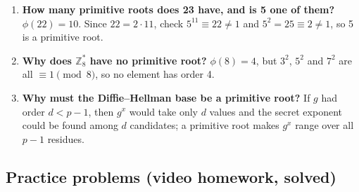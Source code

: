 \begin{enumerate}[leftmargin=1.5em]
  \item \textbf{How many primitive roots does 23 have, and is 5 one of them?} $\phi(22) = 10$. Since $22 = 2 \cdot 11$, check $5^{11} \equiv 22 \ne 1$ and $5^2 = 25 \equiv 2 \ne 1$, so 5 is a primitive root.
  \item \textbf{Why does $\mathbb{Z}_8^*$ have no primitive root?} $\phi(8) = 4$, but $3^2$, $5^2$ and $7^2$ are all $\equiv 1 \pmod 8$, so no element has order 4.
  \item \textbf{Why must the Diffie--Hellman base be a primitive root?} If $g$ had order $d < p - 1$, then $g^x$ would take only $d$ values and the secret exponent could be found among $d$ candidates; a primitive root makes $g^x$ range over all $p - 1$ residues.
\end{enumerate}

\subsection*{Practice problems (video homework, solved)}
